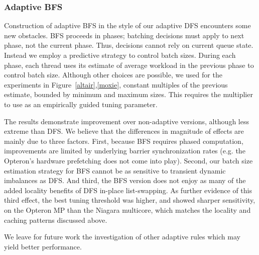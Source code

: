 \subsubsection{Adaptive BFS}

Construction of adaptive BFS in the style of our adaptive DFS
encounters some new obstacles.  BFS proceeds in phases; batching
decisions must apply to next phase, not the current phase. Thus,
decisions cannot rely on current queue state.  Instead we employ a
predictive strategy to control batch sizes. During each phase, each
thread uses its estimate of average workload in the previous phase to
control batch size. Although other choices are possible, we used for
the experiments in Figure~\ref{altair},\ref{moxie}, constant multiples of
the previous estimate, bounded by minimum and maximum sizes. This
requires the multiplier to use as an empirically guided tuning
parameter.

The results demonstrate improvement over non-adaptive versions,
although less extreme than DFS.  We believe that the differences in
magnitude of effects are mainly due to three factors. First, because
BFS requires phased computation, improvements are limited by
underlying barrier synchronization rates (e.g.{} the Opteron's hardware
prefetching does not come into play). Second, our batch size
estimation strategy for BFS cannot be as sensitive to transient
dynamic imbalances as DFS.  And third, the BFS version does not enjoy
as many of the added locality benefits of DFS in-place list-swapping.
As further evidence of this third effect, the best tuning threshold
was higher, and showed sharper sensitivity, on the Opteron MP than the
Niagara multicore, which matches the locality and caching patterns
discussed above.

We leave for future work the investigation of other adaptive rules which may yield better performance. 


